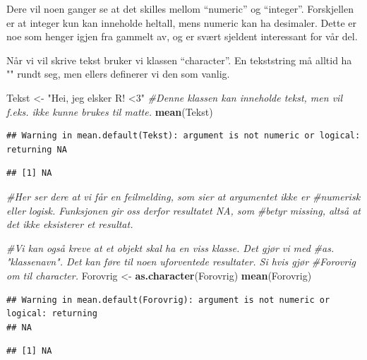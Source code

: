 \documentclass[
]{article}
\newenvironment{Shaded}{\begin{snugshade}}{\end{snugshade}}
\newcommand{\CommentTok}[1]{\textcolor[rgb]{0.56,0.35,0.01}{\textit{#1}}}
\newcommand{\KeywordTok}[1]{\textcolor[rgb]{0.13,0.29,0.53}{\textbf{#1}}}
\newcommand{\NormalTok}[1]{#1}
\newcommand{\StringTok}[1]{\textcolor[rgb]{0.31,0.60,0.02}{#1}}
\begin{document}
Dere vil noen ganger se at det skilles mellom ``numeric'' og
``integer''. Forskjellen er at integer kun kan inneholde heltall, mens
numeric kan ha desimaler. Dette er noe som henger igjen fra gammelt av,
og er svært sjeldent interessant for vår del.

Når vi vil skrive tekst bruker vi klassen ``character''. En tekststring
må alltid ha "" rundt seg, men ellers definerer vi den som vanlig.

\begin{Shaded}
\begin{Highlighting}[]
\NormalTok{Tekst <-}\StringTok{ "Hei, jeg elsker R! <3"}
\CommentTok{#Denne klassen kan inneholde tekst, men vil f.eks. ikke kunne brukes til matte. }
\KeywordTok{mean}\NormalTok{(Tekst)}
\end{Highlighting}
\end{Shaded}

\begin{verbatim}
## Warning in mean.default(Tekst): argument is not numeric or logical: returning NA
\end{verbatim}

\begin{verbatim}
## [1] NA
\end{verbatim}

\begin{Shaded}
\begin{Highlighting}[]
\CommentTok{#Her ser dere at vi får en feilmelding, som sier at argumentet ikke er}
\CommentTok{#numerisk eller logisk. Funksjonen gir oss derfor resultatet NA, som}
\CommentTok{#betyr missing, altså at det ikke eksisterer et resultat. }

\CommentTok{#Vi kan også kreve at et objekt skal ha en viss klasse. Det gjør vi med}
\CommentTok{#as. "klassenavn". Det kan føre til noen uforventede resultater. Si hvis gjør}
\CommentTok{#Forovrig om til character. }
\NormalTok{Forovrig <-}\StringTok{ }\KeywordTok{as.character}\NormalTok{(Forovrig)}
\KeywordTok{mean}\NormalTok{(Forovrig)}
\end{Highlighting}
\end{Shaded}

\begin{verbatim}
## Warning in mean.default(Forovrig): argument is not numeric or logical: returning
## NA
\end{verbatim}

\begin{verbatim}
## [1] NA
\end{verbatim}
\end{document}
